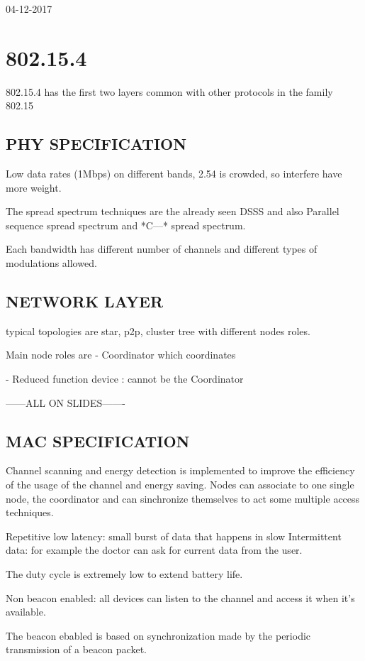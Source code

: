 04-12-2017

\section{802.15.4}

802.15.4 has the first two layers common with other protocols in the family 802.15
\subsection{PHY SPECIFICATION}
Low data rates (1Mbps) on different bands, 2.54 is crowded, so interfere have more weight.

The spread spectrum techniques are the already seen DSSS and also Parallel sequence spread spectrum and *C---* spread spectrum.

Each bandwidth has different number of channels and different types of modulations allowed.

\subsection{NETWORK LAYER}

typical topologies are star, p2p, cluster tree with different nodes roles.

Main node roles are
- Coordinator which  coordinates

- Reduced function device : cannot be the Coordinator

------ALL ON SLIDES-------

\subsection{MAC SPECIFICATION}
Channel scanning and energy detection is implemented to improve the efficiency of the usage of the channel and energy saving. Nodes can associate to one single node, the coordinator and can sinchronize themselves to act some multiple access techniques.

Repetitive low latency: small burst of data that happens in slow
Intermittent data: for example the doctor can ask for current data from the user.

The duty cycle is extremely low to extend battery life.

Non beacon enabled: all devices can listen to the channel and access it when it's available.

The beacon ebabled is based on synchronization made by the periodic transmission of a beacon packet.

